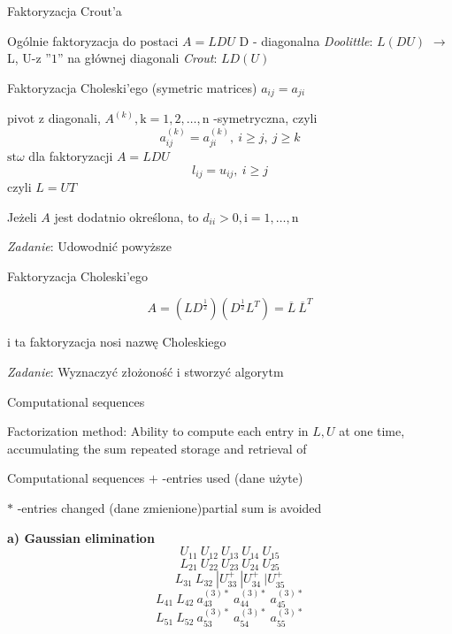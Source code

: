 \begin{frame}{ Faktoryzacja Crout'a}
\begin{exampleblock}{Ogólnie faktoryzacja do postaci $A=LDU$}
D - diagonalna \hspace{40mm } {\it Doolittle}: \hspace{10mm} $L(DU)$ \newline
\hspace*{55mm} $\rightarrow$ 
\newline
 L, U-z ''$1$'' na głównej diagonali \hspace{15mm} {\it Crout}: \hspace{11mm}  $LD(U)$
\newline 
\end{exampleblock}
\end{frame}
\begin{frame}{Faktoryzacja Choleski'ego}
(symetric matrices) $a_{ij}=a_{ji}$

pivot z diagonali, $A^{(k)}, \mathrm{k}=1,2,\ldots,\mathrm{n}$ -symetryczna, czyli
$$
a_{ij}^{(k)}=a_{ji}^{(k)},\ i\geq j,\ j\geq k
$$
$\mathrm{s}\mathrm{t}\omega$ dla faktoryzacji $A=LDU$
$$
l_{ij}=u_{ij},\ i\geq j
$$
czyli $L=UT$

Jeżeli $A$ jest dodatnio określona, to $d_{ii}>0, \mathrm{i}=1,\ldots,\mathrm{n}$
\begin{flushright}
{\it Zadanie}: Udowodnić powyższe 
\end{flushright}

\end{frame}
\begin{frame}{Faktoryzacja Choleski'ego}
\begin{exampleblock}{}
$$
A=(LD^{\frac{1}{2}})(D^{\frac{1}{2}}L^{T})=\overline{L}\ \overline{L}^{T}
$$
\end{exampleblock}
i ta faktoryzacja nosi nazwę Choleskiego
\begin{flushright}
{\it Zadanie}: Wyznaczyć złożoność i stworzyć algorytm
\end{flushright}
\end{frame}
\begin{frame}{Computational sequences}
\begin{exampleblock}{Factorization method:}
Ability to compute each entry in $L,U$ at one time, accumulating the sum repeated storage and retrieval of 
\end{exampleblock}
 

\end{frame}
\begin{frame}{Computational sequences}
$+$ -entries used (dane użyte)

$*$ -entries changed (dane zmienione)partial sum is avoided

\textbf{ a) Gaussian elimination}
$$
U_{11}\ U_{12}\ U_{13}\ U_{14}\ U_{15}
$$
$$
L_{21}\ U_{22}\ U_{23}\ U_{24}\ U_{25}
$$
$$
L_{31}\ L_{32}\ |U_{33}^{+}\ |U_{34}^{+}\ |U_{35}^{+}
$$
$$
L_{41}\ L_{42}\ a_{43}^{(3)*}\ a_{44}^{(3)*}\ a_{45}^{(3)*}
$$
$$
L_{51}\ L_{52}\ a_{53}^{(3)*}\ a_{54}^{(3)*}\ a_{55}^{(3)*}
$$

\end{frame}
